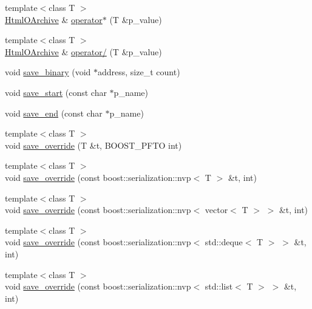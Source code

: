 \begin{DoxyCompactItemize}
\item 
{\footnotesize template$<$class T $>$ }\\\hyperlink{classxtd_1_1servers_1_1app_1_1HtmlOArchive}{Html\-O\-Archive} \& \hyperlink{classxtd_1_1servers_1_1app_1_1HtmlOArchive_ae016000cf5b06b408aa4bfd37c6b354c}{operator$\ast$} (T \&p\-\_\-value)
\item 
{\footnotesize template$<$class T $>$ }\\\hyperlink{classxtd_1_1servers_1_1app_1_1HtmlOArchive}{Html\-O\-Archive} \& \hyperlink{classxtd_1_1servers_1_1app_1_1HtmlOArchive_a5d77d1300bbdbd5e52fec866860bc817}{operator/} (T \&p\-\_\-value)
\item 
void \hyperlink{classxtd_1_1servers_1_1app_1_1HtmlOArchive_a2e5b0b22cf26a77dd62c328a9e51c06f}{save\-\_\-binary} (void $\ast$address, size\-\_\-t count)
\item 
void \hyperlink{classxtd_1_1servers_1_1app_1_1HtmlOArchive_a8675544faff21c5a5acd0af123b48d6d}{save\-\_\-start} (const char $\ast$p\-\_\-name)
\item 
void \hyperlink{classxtd_1_1servers_1_1app_1_1HtmlOArchive_ac5013b8fe0cab7d5c9d7ce3aa4549285}{save\-\_\-end} (const char $\ast$p\-\_\-name)
\item 
{\footnotesize template$<$class T $>$ }\\void \hyperlink{classxtd_1_1servers_1_1app_1_1HtmlOArchive_ace3d9830281bb02de4b775b1ec9891a4}{save\-\_\-override} (T \&t, B\-O\-O\-S\-T\-\_\-\-P\-F\-T\-O int)
\item 
{\footnotesize template$<$class T $>$ }\\void \hyperlink{classxtd_1_1servers_1_1app_1_1HtmlOArchive_a05042a771dbeccf101cfa84f170f9f85}{save\-\_\-override} (const boost\-::serialization\-::nvp$<$ T $>$ \&t, int)
\item 
{\footnotesize template$<$class T $>$ }\\void \hyperlink{classxtd_1_1servers_1_1app_1_1HtmlOArchive_abde3d494192429180da751c92e31dc63}{save\-\_\-override} (const boost\-::serialization\-::nvp$<$ vector$<$ T $>$ $>$ \&t, int)
\item 
{\footnotesize template$<$class T $>$ }\\void \hyperlink{classxtd_1_1servers_1_1app_1_1HtmlOArchive_ae389e1d1af8f9e39956617521cfefa5e}{save\-\_\-override} (const boost\-::serialization\-::nvp$<$ std\-::deque$<$ T $>$ $>$ \&t, int)
\item 
{\footnotesize template$<$class T $>$ }\\void \hyperlink{classxtd_1_1servers_1_1app_1_1HtmlOArchive_a629a5c1bd96df5f295be173e4f62883e}{save\-\_\-override} (const boost\-::serialization\-::nvp$<$ std\-::list$<$ T $>$ $>$ \&t, int)

\end{DoxyCompactItemize}
